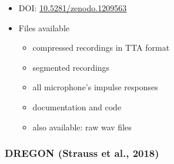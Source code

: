 \documentclass[14pt, legalpaper]{extarticle}
\begin{document}
\begin{itemize}
\item DOI: \href{https://zenodo.org/record/1209563}{10.5281/zenodo.1209563}

\item Files available
	\begin{itemize}
	\item compressed recordings in TTA format
	\item segmented recordings
	\item all microphone's impulse responses
	\item documentation and code
	\item also available: raw wav files
	\end{itemize}

\end{itemize}

\subsubsection{DREGON (Strauss et al., 2018)}
\end{document}
